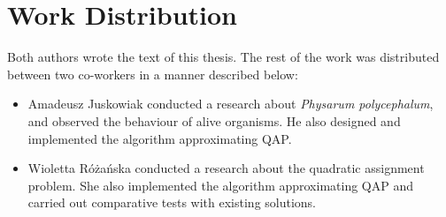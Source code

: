 \section*{Work Distribution}
\label{section:introduction_distribution}

Both authors wrote the text of this thesis. The rest of the work was distributed between two co-workers in a manner described below:
\begin{itemize}
  \item Amadeusz Juskowiak conducted a research about \textit{Physarum polycephalum}, and observed the behaviour of alive organisms. He also designed and implemented the algorithm approximating QAP.
  \item Wioletta Różańska conducted a research about the quadratic assignment problem. She also implemented the algorithm approximating QAP and carried out comparative tests with existing solutions.
\end{itemize}
